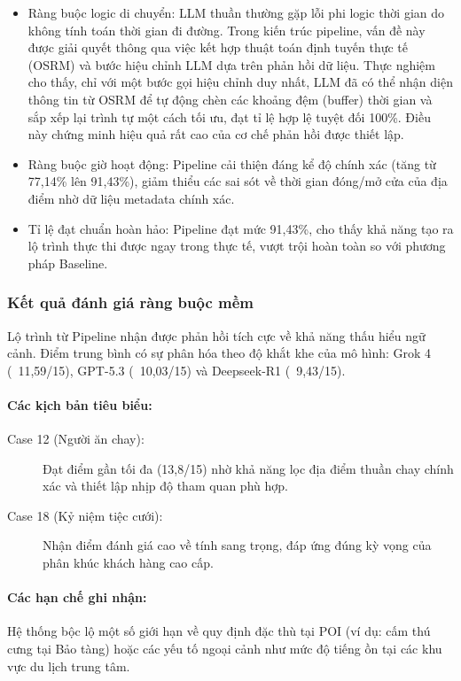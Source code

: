 \begin{itemize}
    \item Ràng buộc logic di chuyển: LLM thuần thường gặp lỗi phi logic thời gian do không tính toán thời gian đi đường. Trong kiến trúc pipeline, vấn đề này được giải quyết thông qua việc kết hợp thuật toán định tuyến thực tế (OSRM) và bước hiệu chỉnh LLM dựa trên phản hồi dữ liệu. Thực nghiệm cho thấy, chỉ với một bước gọi hiệu chỉnh duy nhất, LLM đã có thể nhận diện thông tin từ OSRM để tự động chèn các khoảng đệm (buffer) thời gian và sắp xếp lại trình tự một cách tối ưu, đạt tỉ lệ hợp lệ tuyệt đối 100\%. Điều này chứng minh hiệu quả rất cao của cơ chế phản hồi được thiết lập.
    \item Ràng buộc giờ hoạt động: Pipeline cải thiện đáng kể độ chính xác (tăng từ 77,14\% lên 91,43\%), giảm thiểu các sai sót về thời gian đóng/mở cửa của địa điểm nhờ dữ liệu metadata chính xác.
    \item Tỉ lệ đạt chuẩn hoàn hảo: Pipeline đạt mức 91,43\%, cho thấy khả năng tạo ra lộ trình thực thi được ngay trong thực tế, vượt trội hoàn toàn so với phương pháp Baseline.
\end{itemize}

\subsubsection{Kết quả đánh giá ràng buộc mềm}
Lộ trình từ Pipeline nhận được phản hồi tích cực về khả năng thấu hiểu ngữ cảnh. Điểm trung bình có sự phân hóa theo độ khắt khe của mô hình: Grok 4 (~11,59/15), GPT-5.3 (~10,03/15) và Deepseek-R1 (~9,43/15).

\paragraph{Các kịch bản tiêu biểu:}
\begin{description}
    \item[Case 12 (Người ăn chay):] Đạt điểm gần tối đa (13,8/15) nhờ khả năng lọc địa điểm thuần chay chính xác và thiết lập nhịp độ tham quan phù hợp.
    \item[Case 18 (Kỷ niệm tiệc cưới):] Nhận điểm đánh giá cao về tính sang trọng, đáp ứng đúng kỳ vọng của phân khúc khách hàng cao cấp.
\end{description}

\paragraph{Các hạn chế ghi nhận:} Hệ thống bộc lộ một số giới hạn về quy định đặc thù tại POI (ví dụ: cấm thú cưng tại Bảo tàng) hoặc các yếu tố ngoại cảnh như mức độ tiếng ồn tại các khu vực du lịch trung tâm.

